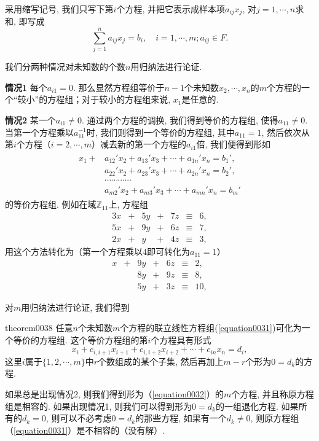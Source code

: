 采用缩写记号, 我们只写下第$i$个方程, 并把它表示成样本项$a_{ij}x_j$, 对$j=1,\cdots,n$求和, 即写成
\[
\sum_{j=1}^{n}{a_{ij}x_j}=b_i,\quad i=1,\cdots,m; a_{ij} \in F.
\]

我们分两种情况对未知数的个数$n$用归纳法进行论证. 

\textbf{情况1} \quad 每个$a_{i1}=0$. 那么显然方程组等价于$n-1$个未知数$x_2,\cdots,x_n$的$m$个方程的一个“较小”的方程组；对于较小的方程组来说, $x_1$是任意的. 

\textbf{情况2} \quad 某一个$a_{i1} \neq 0$. 通过两个方程的调换, 我们得到等价的方程组, 使得$a_{11} \neq 0$. 当第一个方程乘以$a_{11}^{-1}$时, 我们则得到一个等价的方程组, 其中$a_{11}=1$, 然后依次从第$i$个方程（$i=2,\cdots,m$）减去新的第一个方程的$a_{i1}$倍, 我们便得到形如
\begin{gather}\label{equation0032}
\begin{aligned}
x_1+&a_{12}'x_2+a_{13}'x_3+\cdots+a_{1n}'x_n=b_1',\\
&a_{22}'x_2+a_{23}'x_3+\cdots+a_{2n}'x_n=b_2',\\
&\cdots\cdots\cdots\cdots\\
&a_{m2}'x_2+a_{m3}'x_3+\cdots+a_{mn}'x_n=b_m'
\end{aligned}
\end{gather}
的等价方程组. 例如在域$\mathbb{Z}_11$上, 方程组
\[
\begin{array}{rcrcrcl}
3x&+&5y&+&7z&\equiv&6,\\
5x&+&9y&+&6z&\equiv&7,\\
2x&+&y&+&4z&\equiv&3,
\end{array}
\]
用这个方法转化为（第一个方程乘以4即可转化为$a_{11}=1$）
\[
\begin{array}{rcrcrcl}
x&+&9y&+&6z&\equiv&2,\\
&&8y&+&9z&\equiv&8,\\
&&5y&+&3z&\equiv&10,
\end{array}
\]

对$m$用归纳法进行论证, 我们得到
\begin{theorem}{}{theorem0038}
任意$n$个未知数$m$个方程的联立线性方程组(\ref{equation0031})可化为一个等价的方程组. 这个等价方程组的第$i$个方程具有形式
\begin{equation}\label{equation0033}
x_i + c_{i,i+1}x_{i+1}+c_{i,i+2}x_{i+2}+\cdots+c_{in}x_n=d_i,
\end{equation}
这里$i$属于$\{1,2,\cdots,m\}$中$r$个数组成的某个子集, 然后再加上$m-r$个形为$0=d_k$的方程. 
\end{theorem}

如果总是出现情况2, 则我们得到形为（\ref{equation0032}）的$m$个方程, 并且称原方程组是相容的. 如果出现情况1, 则我们可以得到形为$0=d_k$的一组退化方程. 如果所有的$d_k=0$, 则可以不必考虑$0=d_k$的那些方程, 如果有一个$d_k \neq 0$, 则原方程组（\ref{equation0031}）是不相容的（没有解）. 

